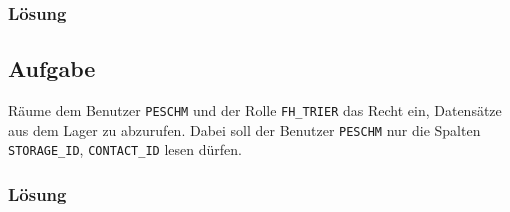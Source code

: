 \subsubsection*{Lösung}
\label{sec:uebung_03.aufgabe_06.loesung}

\subsection{Aufgabe}
\label{sec:uebung_03.aufgabe_07}
Räume dem Benutzer \texttt{PESCHM} und der Rolle \texttt{FH\_TRIER} das Recht ein, Datensätze aus dem Lager zu abzurufen. Dabei soll der Benutzer \texttt{PESCHM} nur die Spalten \texttt{STORAGE\_ID}, \texttt{CONTACT\_ID} lesen dürfen.

\subsubsection*{Lösung}
\label{sec:uebung_03.aufgabe_07.loesung}
